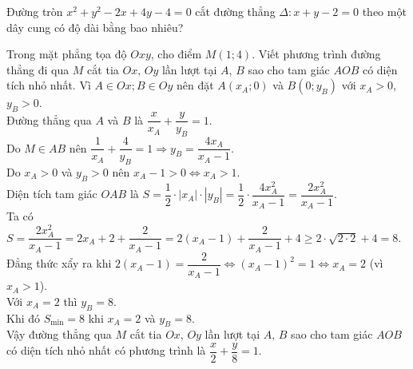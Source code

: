 	\begin{bt}%
		Đường tròn $x^2+y^2-2x+4y-4=0$ cắt đường thẳng $\Delta\colon x+y-2=0$ theo một dây cung có độ dài bằng bao nhiêu?
		
	\end{bt}
	\begin{bt}%
		Trong mặt phẳng tọa độ $Oxy$, cho điểm ${M}(1 ;   4)$. Viết phương trình đường thẳng đi qua ${M}$ cắt tia $Ox,\, Oy$ lần lượt tại ${A}, \, {B}$ sao cho tam giác ${AOB}$ có diện tích nhỏ nhất.
		\loigiai
		{
			Vì $A \in Ox;  B\in Oy$ nên đặt $A(x_A;  0)$ và $B(0; y_B)$ với $x_A>0$, $y_B>0$.\\
			Đường thẳng qua $A$ và $B$ là $\dfrac{x}{x_A}+\dfrac{y}{y_B}=1$.\\
			Do $M\in AB$ nên $\dfrac{1}{x_A}+\dfrac{4}{y_B}=1\Rightarrow y_B=\dfrac{4x_A}{x_A-1}$.\\
			Do $x_A>0$ và $y_B>0$ nên $x_A-1>0 \Leftrightarrow x_A>1$. \\
			Diện tích tam giác $OAB$ là $S=\dfrac{1}{2}\cdot|x_A|\cdot|y_B|=\dfrac{1}{2}\cdot\dfrac{4x_A^2}{x_A-1}=\dfrac{2x_A^2}{x_A-1}$.\\
			Ta có $S=\dfrac{2x_A^2}{x_A-1}=2x_A+2+\dfrac{2}{x_A-1}=2(x_A-1)+\dfrac{2}{x_A-1}+4\geq2\cdot\sqrt{2\cdot 2}+4=8$. \\
			Đẳng thức xẩy ra khi $2\left(x_A-1\right)=\dfrac{2}{x_A-1} \Leftrightarrow \left(x_A-1\right)^2=1 \Leftrightarrow x_A=2$ (vì $x_A>1$). \\
			Với $x_A=2$ thì $y_B=8$. \\
			Khi đó $S_{\min}=8$ khi $x_A=2$ và $ y_B=8$. \\
			Vậy đường thẳng qua $M$ cắt tia $Ox,\, Oy$ lần lượt tại ${A}, \, {B}$ sao cho tam giác ${AOB}$ có diện tích nhỏ nhất có phương trình là $\dfrac{x}{2}+\dfrac{y}{8}=1$.
		}
	\end{bt}
